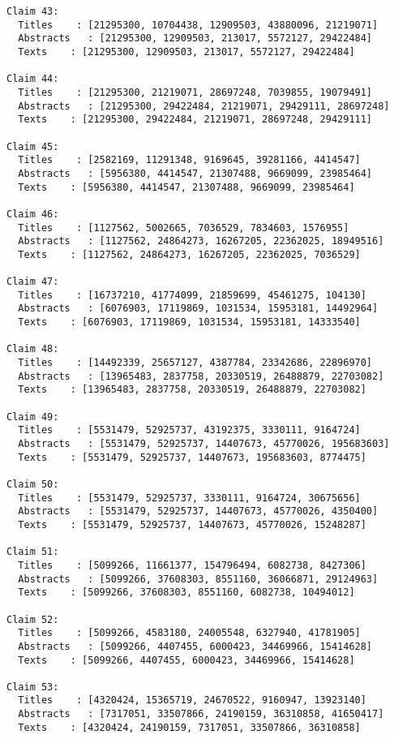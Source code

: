 \documentclass[11pt]{article}
\begin{document}
\begin{Verbatim}[commandchars=\\\{\}]
Claim 43:
  Titles    : [21295300, 10704438, 12909503, 43880096, 21219071]
  Abstracts   : [21295300, 12909503, 213017, 5572127, 29422484]
  Texts    : [21295300, 12909503, 213017, 5572127, 29422484]

Claim 44:
  Titles    : [21295300, 21219071, 28697248, 7039855, 19079491]
  Abstracts   : [21295300, 29422484, 21219071, 29429111, 28697248]
  Texts    : [21295300, 29422484, 21219071, 28697248, 29429111]

Claim 45:
  Titles    : [2582169, 11291348, 9169645, 39281166, 4414547]
  Abstracts   : [5956380, 4414547, 21307488, 9669099, 23985464]
  Texts    : [5956380, 4414547, 21307488, 9669099, 23985464]

Claim 46:
  Titles    : [1127562, 5002665, 7036529, 7834603, 1576955]
  Abstracts   : [1127562, 24864273, 16267205, 22362025, 18949516]
  Texts    : [1127562, 24864273, 16267205, 22362025, 7036529]

Claim 47:
  Titles    : [16737210, 41774099, 21859699, 45461275, 104130]
  Abstracts   : [6076903, 17119869, 1031534, 15953181, 14492964]
  Texts    : [6076903, 17119869, 1031534, 15953181, 14333540]

Claim 48:
  Titles    : [14492339, 25657127, 4387784, 23342686, 22896970]
  Abstracts   : [13965483, 2837758, 20330519, 26488879, 22703082]
  Texts    : [13965483, 2837758, 20330519, 26488879, 22703082]

Claim 49:
  Titles    : [5531479, 52925737, 43192375, 3330111, 9164724]
  Abstracts   : [5531479, 52925737, 14407673, 45770026, 195683603]
  Texts    : [5531479, 52925737, 14407673, 195683603, 8774475]

Claim 50:
  Titles    : [5531479, 52925737, 3330111, 9164724, 30675656]
  Abstracts   : [5531479, 52925737, 14407673, 45770026, 4350400]
  Texts    : [5531479, 52925737, 14407673, 45770026, 15248287]

Claim 51:
  Titles    : [5099266, 11661377, 154796494, 6082738, 8427306]
  Abstracts   : [5099266, 37608303, 8551160, 36066871, 29124963]
  Texts    : [5099266, 37608303, 8551160, 6082738, 10494012]

Claim 52:
  Titles    : [5099266, 4583180, 24005548, 6327940, 41781905]
  Abstracts   : [5099266, 4407455, 6000423, 34469966, 15414628]
  Texts    : [5099266, 4407455, 6000423, 34469966, 15414628]

Claim 53:
  Titles    : [4320424, 15365719, 24670522, 9160947, 13923140]
  Abstracts   : [7317051, 33507866, 24190159, 36310858, 41650417]
  Texts    : [4320424, 24190159, 7317051, 33507866, 36310858]


\end{Verbatim}
\end{document}
